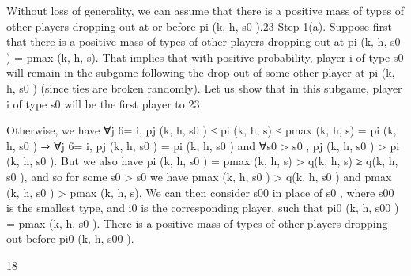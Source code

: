 \documentclass[10pt]{article}
\begin{document}
\begin{ReviewVerbatim}
Without loss of generality, we can assume that there is a positive mass of types of other players
dropping out at or before pi (k, h, s0 ).23
Step 1(a). Suppose first that there is a positive mass of types of other players dropping out
at pi (k, h, s0 ) = pmax (k, h, s). That implies that with positive probability, player i of type s0 will
remain in the subgame following the drop-out of some other player at pi (k, h, s0 ) (since ties are
broken randomly). Let us show that in this subgame, player i of type s0 will be the first player to
23

Otherwise, we have ∀j 6= i, pj (k, h, s0 ) ≤ pi (k, h, s) ≤ pmax (k, h, s) = pi (k, h, s0 ) ⇒ ∀j 6= i, pj (k, h, s0 ) =
pi (k, h, s0 ) and ∀s0 > s0 , pj (k, h, s0 ) > pi (k, h, s0 ). But we also have pi (k, h, s0 ) = pmax (k, h, s) > q(k, h, s) ≥
q(k, h, s0 ), and so for some s0 > s0 we have pmax (k, h, s0 ) > q(k, h, s0 ) and pmax (k, h, s0 ) > pmax (k, h, s). We
can then consider s00 in place of s0 , where s00 is the smallest type, and i0 is the corresponding player, such that
pi0 (k, h, s00 ) = pmax (k, h, s0 ). There is a positive mass of types of other players dropping out before pi0 (k, h, s00 ).

18



\end{ReviewVerbatim}
\end{document}
